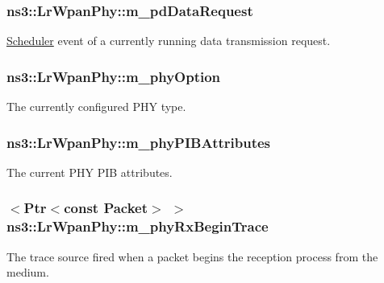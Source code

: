 \subsubsection[{\texorpdfstring{m\+\_\+pd\+Data\+Request}{m_pdDataRequest}}]{ ns3\+::\+Lr\+Wpan\+Phy\+::m\+\_\+pd\+Data\+Request\hspace{0.3cm}{\ttfamily [private]}}\hypertarget{classns3_1_1LrWpanPhy_ac25e1b499978dc6ad31f3c425f6e261a}{}\label{classns3_1_1LrWpanPhy_ac25e1b499978dc6ad31f3c425f6e261a}
\hyperlink{classns3_1_1Scheduler}{Scheduler} event of a currently running data transmission request. 
\subsubsection[{\texorpdfstring{m\+\_\+phy\+Option}{m_phyOption}}]{ ns3\+::\+Lr\+Wpan\+Phy\+::m\+\_\+phy\+Option\hspace{0.3cm}{\ttfamily [private]}}\hypertarget{classns3_1_1LrWpanPhy_a7c89aea4498cefc0bdc2284526f0019b}{}\label{classns3_1_1LrWpanPhy_a7c89aea4498cefc0bdc2284526f0019b}
The currently configured P\+HY type. 
\subsubsection[{\texorpdfstring{m\+\_\+phy\+P\+I\+B\+Attributes}{m_phyPIBAttributes}}]{ ns3\+::\+Lr\+Wpan\+Phy\+::m\+\_\+phy\+P\+I\+B\+Attributes\hspace{0.3cm}{\ttfamily [private]}}\hypertarget{classns3_1_1LrWpanPhy_a7f263bedbdeed627f7c5f2dab8e960c8}{}\label{classns3_1_1LrWpanPhy_a7f263bedbdeed627f7c5f2dab8e960c8}
The current P\+HY P\+IB attributes. 
\subsubsection[{\texorpdfstring{m\+\_\+phy\+Rx\+Begin\+Trace}{m_phyRxBeginTrace}}]{$<${\bf Ptr}$<$const {\bf Packet}$>$ $>$ ns3\+::\+Lr\+Wpan\+Phy\+::m\+\_\+phy\+Rx\+Begin\+Trace\hspace{0.3cm}{\ttfamily [private]}}\hypertarget{classns3_1_1LrWpanPhy_acd238a82f3646333c30a9100fecafbda}{}\label{classns3_1_1LrWpanPhy_acd238a82f3646333c30a9100fecafbda}
The trace source fired when a packet begins the reception process from the medium.

